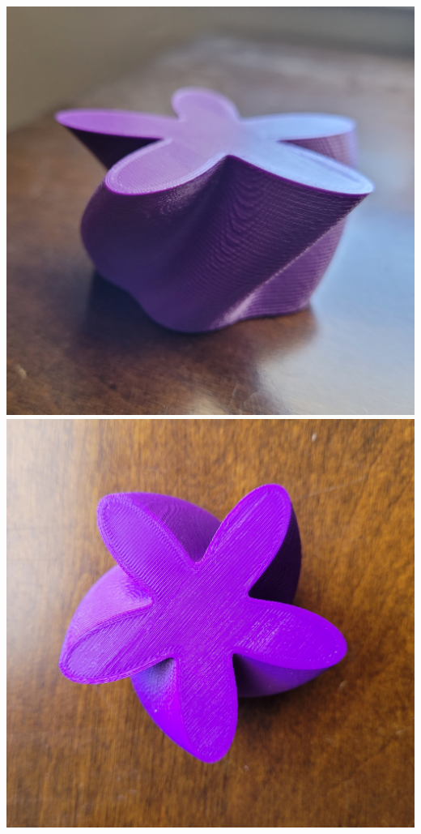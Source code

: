 \documentclass[12 pt]{article}
\begin{document}
\begin{center}
    \includegraphics[width=.3\paperwidth]{images/flowerSide.jpg}\hspace{10pt}
    \includegraphics[width=.3\paperwidth]{images/flowerTop.jpg}
\end{center}
\end{document}
